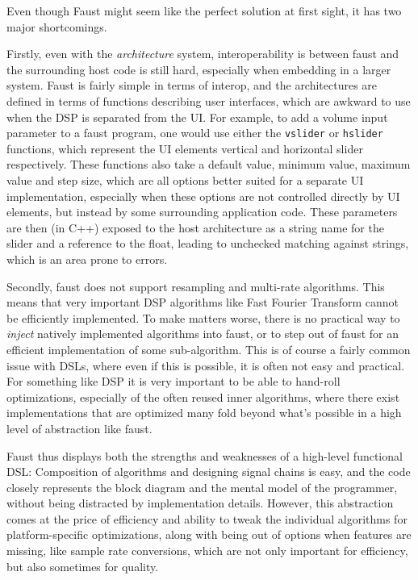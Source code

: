 Even though Faust might seem like the perfect solution at first sight, it has two major shortcomings.

Firstly, even with the \emph{architecture} system, interoperability is between faust and the surrounding
host code is still hard, especially when embedding in a larger system. Faust is fairly simple in terms of
interop, and the architectures are defined in terms of functions describing user interfaces, which are
awkward to use when the DSP is separated from the UI. For example, to add a volume input parameter to a faust
program, one would use either the \lstinline{vslider} or \lstinline{hslider} functions, which represent the UI elements
vertical and horizontal slider respectively. These functions also take a default value, minimum value,
maximum value and step size, which are all options better suited for a separate UI implementation, especially
when these options are not controlled directly by UI elements, but instead by some surrounding application
code. These parameters are then (in C++) exposed to the host architecture as a string name for the slider and
a reference to the float, leading to unchecked matching against strings, which is an area prone to errors.

Secondly, faust does not support resampling and multi-rate algorithms. This means that very important DSP
algorithms like Fast Fourier Transform cannot be efficiently implemented. To make matters worse, there is no
practical way to \emph{inject} natively implemented algorithms into faust, or to step out of faust
for an efficient implementation of some sub-algorithm. This is of course a fairly common issue with DSLs,
where even if this is possible, it is often not easy and practical. For something like DSP it is very
important to be able to hand-roll optimizations, especially of the often reused inner algorithms, where there
exist implementations that are optimized many fold beyond what's possible in a high level of abstraction like
faust.

Faust thus displays both the strengths and weaknesses of a high-level functional DSL: Composition of
algorithms and designing signal chains is easy, and the code closely represents the block diagram and the
mental model of the programmer, without being distracted by implementation details. However, this abstraction
comes at the price of efficiency and ability to tweak the individual algorithms for platform-specific
optimizations, along with being out of options when features are missing, like sample rate conversions, which
are not only important for efficiency, but also sometimes for quality.

